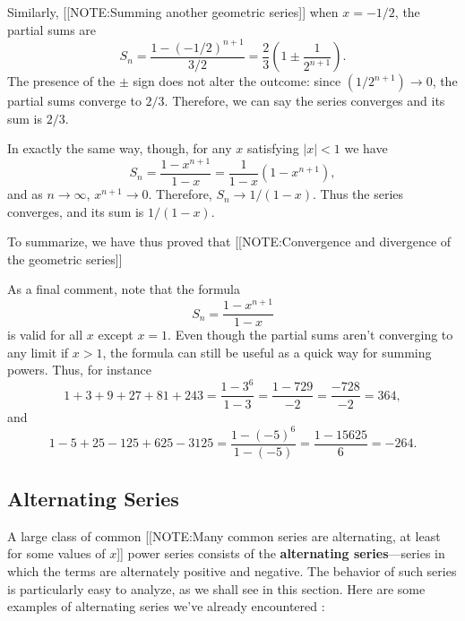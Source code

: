 Similarly, 
[[NOTE:Summing another geometric series]]
when $x = -1/2$, the partial sums are
        \[
S_n = \dfrac{1 - (-1/2)^{n+1}}{3/2} =
                \dfrac{2}{3} \left(
                1 \pm \dfrac{1}{2^{n+1}} \right).
\]
The presence of the $\pm$ sign does not alter the outcome: since
\mbox{$(1/2^{n+1}) \to 0$}, the partial sums converge to $2/3$.
Therefore, we can say the series converges and its sum is $2/3$.



In exactly the same way, though, for any $x$ satisfying $|x|<1$ we have
\[
S_n = \dfrac{1 - x^{n+1}}{1-x} =  \dfrac{1}{1-x}(1-x^{n+1}),
\]
and as $n \to \infty$, $x^{n+1} \to 0$.  Therefore, $S_n \to 1/(1-x)$.
Thus the series converges, and its sum is $1/(1-x)$.

To summarize, we have thus proved that
        [[NOTE:Convergence and divergence of the geometric series]]


\begin{center}
\end{center}

As a final comment, note that the formula
\[
S_n =  \dfrac{1 - x^{n+1}}{1-x}
\]
is valid for all $x$ except $x=1$.  Even though the partial sums
aren't converging to any limit if $x>1$, the formula can still be
useful as a quick way for summing powers.  Thus, for instance
\[
1 + 3 + 9 + 27 + 81 + 243 = \dfrac{1-3^6}{1-3}
   = \dfrac{1-729}{-2} = \dfrac{-728}{-2}=364,
\]
and
\[
1 - 5 + 25 - 125 + 625 - 3125 = \dfrac{1-(-5)^6}{1-(-5)}
   = \dfrac{1-15625}{6} = -264.
\]


\subsection{Alternating Series}
\label{subsec:alternating-series}

A large class of common 
[[NOTE:Many common series are alternating, at least for some values of $x$]]
power series consists of the {\bf alternating
  series}---series in which
the terms are alternately positive and negative.  The behavior of such
series is particularly easy to analyze, as we shall see in this
section. Here are some examples of alternating series we've already
encountered :



